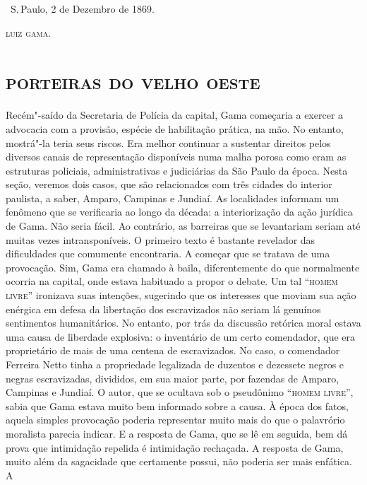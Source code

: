 \vfill

\hfill\ S.\,Paulo, 2 de Dezembro de 1869.\smallskip

\hfill\textsc{luiz gama.}

\paginabranca
\begingroup\makeatletter\@openrightfalse
\part{\textsc{porteiras do velho oeste}}

\pagebreak
\thispagestyle{empty}

{\small\noindent
Recém"-saído da Secretaria de Polícia da capital, Gama começaria a
exercer a advocacia com a provisão, espécie de habilitação prática, na
mão. No entanto, mostrá"-la teria seus riscos. Era melhor continuar a
sustentar direitos pelos diversos canais de representação disponíveis numa malha
porosa como eram as estruturas policiais, administrativas e judiciárias
da São Paulo da época. Nesta seção, veremos dois casos, que são
relacionados com três cidades do interior paulista, a saber, Amparo,
Campinas e Jundiaí. As localidades informam um fenômeno que se
verificaria ao longo da década: a interiorização da ação jurídica
de Gama. Não seria fácil. Ao contrário, as barreiras que se levantariam
seriam até muitas vezes intransponíveis. O primeiro texto é bastante
revelador das dificuldades que comumente encontraria. A começar que se
tratava de uma provocação. Sim, Gama era chamado à baila, diferentemente
do que normalmente ocorria na capital, onde estava habituado a propor o
debate. Um tal ``\textsc{homem livre}'' ironizava suas intenções, sugerindo que os
interesses que moviam sua ação enérgica em defesa da libertação dos
escravizados não seriam lá genuínos sentimentos humanitários. No
entanto, por trás da discussão retórica moral estava uma causa de
liberdade explosiva: o inventário de um certo comendador, que era
proprietário de mais de uma centena de escravizados. No caso, o
comendador Ferreira Netto tinha a propriedade legalizada de duzentos e
dezessete negros e negras escravizadas, divididos, em sua maior parte,
por fazendas de Amparo, Campinas e Jundiaí. O autor, que se ocultava sob
o pseudônimo ``\textsc{homem livre}'', sabia que Gama estava muito bem informado
sobre a causa. À época dos fatos, aquela simples provocação poderia
representar muito mais do que o palavrório moralista parecia indicar. E
a resposta de Gama, que se lê em seguida, bem dá prova que intimidação
repelida é intimidação rechaçada. A resposta de Gama, muito além da
sagacidade que certamente possui, não poderia ser mais enfática. A
}
